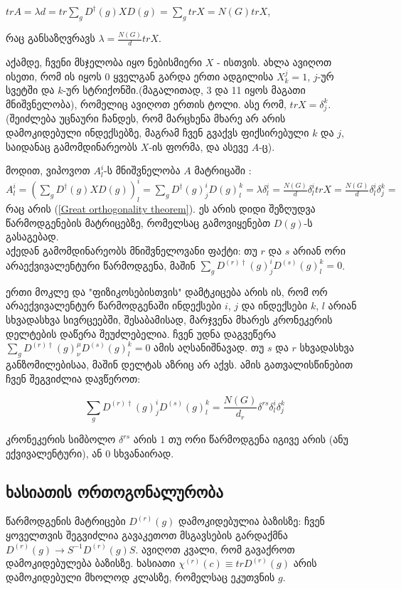 \documentclass[12pt]{article}
\begin{document}
\begin{sloppypar}
$
tr A = 
\lambda d =
tr \sum_gD^{\dagger}(g)XD(g) =
\sum_g tr X =
N(G) tr X
$,

რაც განსაზღვრავს $\lambda= \frac{N(G)}{d}tr X$.

აქამდე, ჩვენი მსჯელობა იყო ნებისმიერი $X$ - ისთვის. ახლა ავიღოთ ისეთი, რომ ის იყოს 0 ყველგან გარდა ერთი ადგილისა $X^j_k=1$, $j$-ურ სვეტში და $k$-ურ სტრიქონში.(მაგალითად, 3 და 11 იყოს მაგათი მნიშვნელობა), რომელიც ავიღოთ ერთის ტოლი. ასე რომ, $tr X= \delta^k_j$. (შეიძლება უცნაური ჩანდეს, რომ მარცხენა მხარე არ არის დამოკიდებული ინდექსებზე, მაგრამ ჩვენ გვაქვს ფიქსირებული $k$ და $j$, საიდანაც გამომდინარეობს $X$-ის ფორმა, და ასევე $A$-ც).

მოდით, ვიპოვოთ $A^i_l$-ს მნიშვნელობა $A$ მატრიცაში :
$
A^i_l = 
(\sum_gD^{\dagger}(g)XD(g))^i_l =
\sum_gD^{\dagger}(g)^i_jD(g)^k_l =
\lambda \delta ^i_l=
\frac{N(G)}{d} \delta ^i_l tr X=
\frac{N(G)}{d} \delta ^i_l \delta ^k_j=
$
რაც არის (\ref{Great orthogonality theorem}). ეს არის დიდი შეზღუდვა წარმოდგენების მატრიცებზე, რომელსაც გამოვიყენებთ $D(g)$-ს გასაგებად.\\

აქედან გამომდინარეობს მნიშვნელოვანი ფაქტი: თუ $r$ და $s$ არიან ორი არაექვივალენტური წარმოდგენა, მაშინ $\sum_gD^{(r)\dagger}(g)^i_jD^{(s)}(g)^k_l = 0$.

ერთი მოკლე და "ფიზიკოსებისთვის" დამტკიცება არის ის, რომ ორ არაექვივალენტურ წარმოდგენაში ინდექსები $i$, $j$ და ინდექსები $k$, $l$ არიან სხვადასხვა სივრცეებში, შესაბამისად, მარჯვენა მხარეს კრონეკერის დელტების დაწერა შეუძლებელია. ჩვენ უდნა დაგვეწერა $\sum_gD^{(r)\dagger}(g)^{\mu}_{\nu}D^{(s)}(g)^k_l = 0$ ამის აღსანიშნავად. თუ $s$ და $r$ სხვადასხვა განზომილებისაა, მაშინ დელტას აზრიც არ აქვს.
ამის გათვალისწინებით ჩვენ შეგვიძლია დავწეროთ:


\begin{equation} \label{General Great orthogonality theorem}
		\sum_{g}D^{(r)\dagger}(g)^i_jD^{(s)}(g)^k_l = \frac{N(G)}{d_r}\delta^{rs}\delta^i_l\delta^k_j
\end{equation}

კრონეკერის სიმბოლო $\delta^{rs}$ არის 1 თუ ორი წარმოდგენა იგივე არის (ანუ ექვივალენტური), ან 0 სხვანაირად.


\subsection{ხასიათის ორთოგონალურობა}

წარმოდგენის მატრიცები $D^{(r)}(g)$ დამოკიდებულია ბაზისზე: ჩვენ ყოველთვის შეგვიძლია გავაკეთოთ მსგავსების გარდაქმნა $D^{(r)}(g) \rightarrow S^{-1}D^{(r)}(g) S$. ავიღოთ კვალი, რომ გავაქროთ დამოკიდებულება ბაზისზე. ხასიათი $\chi^{(r)}(c) \equiv tr D^{(r)}(g)$ არის დამოკიდებული მხოლოდ კლასზე, რომელსაც ეკუთვნის $g$.


\end{sloppypar}
\end{document}
